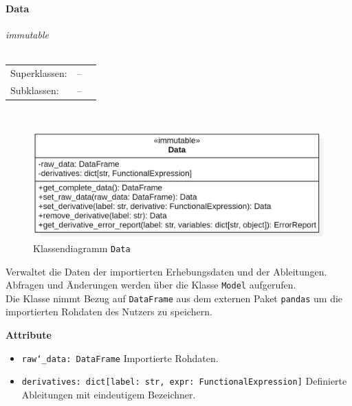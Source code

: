 \documentclass{article}
\newcommand{\classheader}[2][]{\paragraph{#2}
\mbox{}\textit{#1}\\\\}
\begin{document}
\newpage
\classheader[\flqq{}immutable\frqq]{Data}\label{cls:Data}
\begin{tabular}{lll}
 Superklassen: & --\\
 Subklassen: & --\\
\end{tabular}\\
\begin{figure}[H]%
    \centering
    \includegraphics[width=13cm]{entwurf/Entwurf_dokument/img/cls/model/Data.png}
    \caption{Klassendiagramm \texttt{Data}}
\end{figure}

Verwaltet die Daten der importierten Erhebungsdaten und der Ableitungen. Abfragen und Änderungen werden über die Klasse \texttt{Model} aufgerufen.\\
Die Klasse nimmt Bezug auf \texttt{DataFrame} aus dem externen Paket \texttt{pandas} um die importierten Rohdaten des Nutzers zu speichern.
\newline \newline

\textbf{{Attribute}}
\begin{itemize}
\item \texttt{raw\char`_data: DataFrame} \newline Importierte Rohdaten.
\item \texttt{derivatives: dict[label: str, expr: FunctionalExpression]} \newline Definierte Ableitungen mit eindeutigem Bezeichner.
\\\\
\end{itemize}
\end{document}
